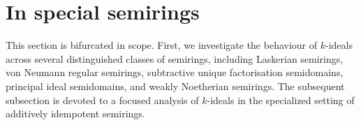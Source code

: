 \documentclass[11pt,leqno]{amsart}
\newcommand{\add}[1]{{\color{Red}#1}}
\newtheorem{theorem}{Theorem}[section]
\theoremstyle{definition}
\newtheorem{definition}[theorem]{Definition}
\numberwithin{equation}{section}
\begin{document}









\section{In special semirings}\label{Section 6: k-ideals and its variants in special semirings}
This section is bifurcated in scope. First, we investigate the behaviour of 
$k$-ideals across several distinguished  classes of semirings, including Laskerian semirings, von Neumann regular semirings, subtractive unique factorisation semidomains, principal ideal semidomains, and weakly Noetherian semirings. The subsequent subsection is devoted to a focused analysis of 
$k$-ideals in the specialized setting of additively idempotent semirings.
\end{document}
